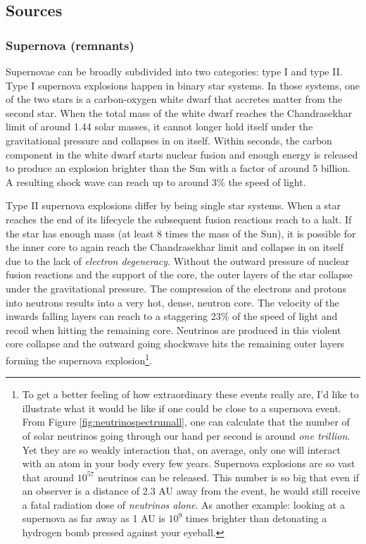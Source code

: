 \subsection{Sources}
\subsubsection{Supernova (remnants)}
\label{subsubsec:supernovae}
Supernovae can be broadly subdivided into two categories: type I and type II. Type I supernova explosions happen in binary star systems. In those systems, one of the two stars is a carbon-oxygen white dwarf that accretes matter from the second star. When the total mass of the white dwarf reaches the Chandrasekhar limit of around 1.44 solar masses, it cannot longer hold itself under the gravitational pressure and collapses in on itself. Within seconds, the carbon component in the white dwarf starts nuclear fusion and enough energy is released to produce an explosion brighter than the Sun with a factor of around 5 billion. 
A resulting shock wave can reach up to around 3\% the speed of light.

Type II supernova explosions differ by being single star systems. When a star reaches the end of its lifecycle the subsequent fusion reactions reach to a halt. If the star has enough mass (at least 8 times the mass of the Sun), it is possible for the inner core to again reach the Chandrasekhar limit and collapse in on itself due to the lack of \textit{electron degeneracy}. Without the outward pressure of nuclear fusion reactions and the support of the core, the outer layers of the star collapse under the gravitational pressure. The compression of the electrons and protons into neutrons results into a very hot, dense, neutron core. The velocity of the inwards falling layers can reach to a staggering 23\% of the speed of light and recoil when hitting the remaining core. Neutrinos are produced in this violent core collapse and the outward going shockwave hits the remaining outer layers forming the supernova explosion\footnote{To get a better feeling of how extraordinary these events really are, I'd like to illustrate what it would be like if one could be close to a supernova event. From Figure \ref{fig:neutrinospectrumall}, one can calculate that the number of of solar neutrinos going through our hand per second is around \textit{one trillion}. Yet they are so weakly interaction that, on average, only one will interact with an atom in your body every few years. Supernova explosions are so vast that around $10^{57}$ neutrinos can be released. This number is so big that even if an observer is a distance of 2.3 AU away from the event, he would still receive a fatal radiation dose of \textit{neutrinos alone}. As another example: looking at a supernova as far away as 1 AU is $10^9$ times brighter than detonating a hydrogen bomb pressed against your eyeball.}.

